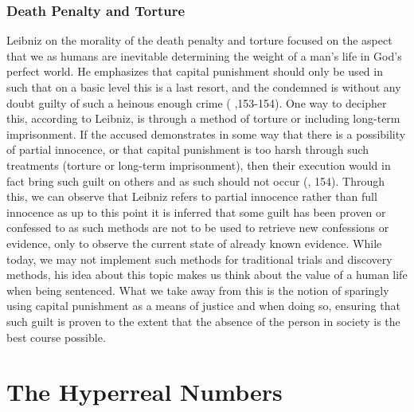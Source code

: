 \documentclass[12pt]{report}
\begin{document}
\section*{Death Penalty and Torture}
Leibniz on the morality of the death penalty and torture focused on the aspect that we as humans are inevitable determining the weight of a man's life in God's perfect world.
He emphasizes that capital punishment should only be used in such that on a basic level this is a last resort, and the condemned is without any doubt guilty of such a heinous enough crime ( ,153-154).
One way to decipher this, according to Leibniz, is through a method of torture or including long-term imprisonment.
If the accused demonstrates in some way that there is a possibility of partial innocence, or that capital punishment is too harsh through such treatments (torture or long-term imprisonment), then their execution would in fact bring such guilt on others and as such should not occur (, 154).
Through this, we can observe that Leibniz refers to partial innocence rather than full innocence as up to this point it is inferred that some guilt has been proven or confessed to as such methods are not to be used to retrieve new confessions or evidence, only to observe the current state of already known evidence.
While today, we may not implement such methods for traditional trials and discovery methods, his idea about this topic makes us think about the value of a human life when being sentenced.
What we take away from this is the notion of sparingly using capital punishment as a means of justice and when doing so, ensuring that such guilt is proven to the extent that the absence of the person in society is the best course possible.
\newpage
\part{The Hyperreal Numbers}
\newpage
\end{document}
